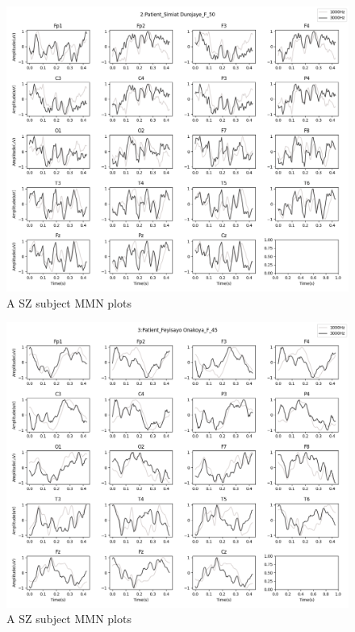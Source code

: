 \documentclass[10pt]{article}
\begin{document}
\begin{figure}[H]
  \includegraphics[width=16cm]{../../../data_analysis_results/MMN/time_series/Patient/2.png}
  \caption{A SZ subject MMN plots}
\end{figure}
\begin{figure}[H]
  \includegraphics[width=16cm]{../../../data_analysis_results/MMN/time_series/Patient/3.png}
  \caption{A SZ subject MMN plots}
\end{figure}
\end{document}
